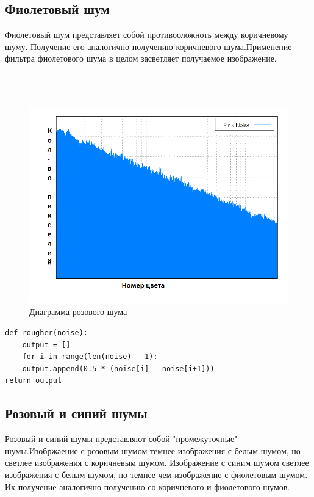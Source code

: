 \subsection{Фиолетовый шум}
Фиолетовый  шум представляет собой противооложноть между коричневому шуму. Получение его аналогично получению коричневого шума.Применение фильтра фиолетового шума в целом засветляет получаемое изображение.
\\\\\\\\
\begin{figure}[h!]
	\centering
	\includegraphics[width=\textwidth]{img/7_pink_noise.png}
	\caption{Диаграмма розового шума}
	\label{fig:spire02}
\end{figure}
\begin{lstlisting}[style=pseudocode,caption={Получение розового шума}]
def rougher(noise):
    output = []
    for i in range(len(noise) - 1):
    output.append(0.5 * (noise[i] - noise[i+1]))
return output
\end{lstlisting}

\subsection{Розовый и синий шумы}
Розовый и синий шумы представляют собой "промежуточные" шумы.Изобржаение с розовым шумом темнее  изображения с белым шумом, но светлее изображения с коричневым шумом. Изображение с синим шумом светлее изображения с белым шумом, но темнее чем изображение с фиолетовым шумом. Их получение аналогично получению со коричневого и фиолетового шумов.

